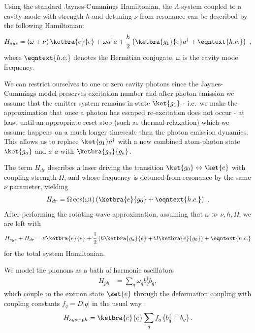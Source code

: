 Using the standard Jaynes-Cummings Hamiltonian, the $\Lambda$-system coupled to a cavity mode with strength $h$ and detuning $\nu$ from resonance  can be described by the following Hamiltonian:
\begin{eqnarray}
  H_{sys} = \left(\omega + \nu\right)\ketbra{e}{e} + \omega a^\dagger a + \frac{h}{2}\left(\ketbra{g_1}{e}a^\dagger + \eqntext{h.c.} \right)~,
\end{eqnarray}
where $\eqntext{h.c.}$ denotes the Hermitian conjugate. $\omega$ is the cavity mode frequency.

We can restrict ourselves to one or zero cavity photons since the Jaynes-Cummings model preserves excitation number and after photon emission we assume that the emitter system remains in state $\ket{g_1}$ - i.e.\ we make the approximation that once a photon has escaped re-excitation does not occur - at least until an appropriate reset step (such as thermal relaxation) which we assume happens on a much longer timescale than the photon emission dynamics. This allows us to replace $\ket{g_1}a^\dagger$ with a new combined atom-photon state $\ket{g_a}$ and $a^\dagger a$ with $\ketbra{g_a}{g_a}$. 

The term $H_{dr}$ describes a laser driving the transition $\ket{g_0} \leftrightarrow \ket{e}$ with coupling strength $\Omega$, and whose frequency is detuned from resonance by the same $\nu$ parameter, yielding
\begin{eqnarray}
  H_{dr} = \Omega \cos(\omega t) \left(\ketbra{e}{g_0} + \eqntext{h.c.} \right)~.
\end{eqnarray}
After performing the rotating wave approximation, assuming that $\omega \gg \nu, h, \Omega$, we are left with 
\begin{eqnarray}
  H_{sys} + H_{dr} =  \nu\ketbra{e}{e} + \frac{1}{2}\left(h \ketbra{g_a}{e} + \Omega \ketbra{e}{g_0}\right) + \eqntext{h.c.}
\end{eqnarray}
for the total system Hamiltonian.

We model the phonons as a bath of harmonic oscillators
\begin{eqnarray}
  H_{ph} &= \sum_q \omega_q b_q^\dagger b_q,
\end{eqnarray}
which couple to the exciton state $\ket{e}$ through the deformation coupling with coupling  constants $f_q = D|q|$ in the usual way \cite{mahan00}: 
\begin{eqnarray}
  H_{sys-ph} = \ketbra{e}{e}\sum_q f_q \left(b_q^\dagger + b_q\right).
\end{eqnarray}

